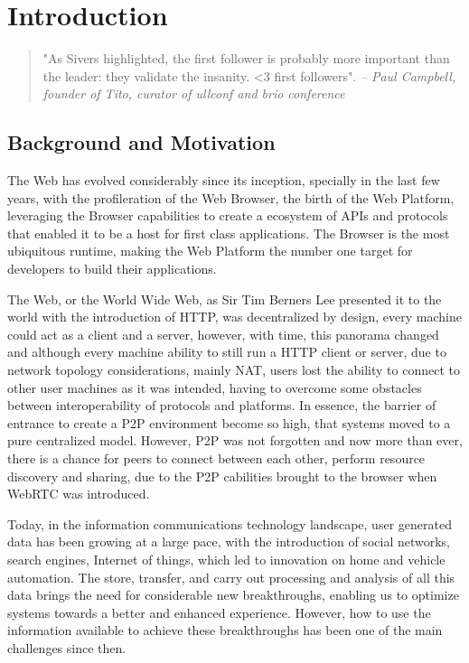 \chapter{Introduction}\label{ch:intro}

\begin{quotation}
    "As Sivers highlighted, the first follower is probably more important than the leader: they validate the insanity. <3 first followers".
    {\small\it -- Paul Campbell, founder of Tito, curator of ullconf and brio conference}
\end{quotation}

\section{Background and Motivation}

The Web has evolved considerably since its inception, specially in the last few years, with the profileration of the Web Browser, the birth of the Web Platform, leveraging the Browser capabilities to create a ecosystem of APIs and protocols that enabled it to be a host for first class applications. The Browser is the most ubiquitous runtime, making the Web Platform the number one target for developers to build their applications.

The Web, or the World Wide Web, as Sir Tim Berners Lee presented it to the world with the introduction of HTTP, was decentralized by design, every machine could act as a client and a server, however, with time, this panorama changed and although every machine ability to still run a HTTP client or server, due to network topology considerations, mainly NAT, users lost the ability to connect to other user machines as it was intended, having to overcome some obstacles between interoperability of protocols and platforms. In essence, the barrier of entrance to create a P2P environment become so high, that systems moved to a pure centralized model. However, P2P was not forgotten and now more than ever, there is a chance for peers to connect between each other, perform resource discovery and sharing, due to the P2P cabilities brought to the browser when WebRTC was introduced.

Today, in the information communications technology landscape, user generated data has been growing at a large pace, with the introduction of social networks, search engines, Internet of things, which led to innovation on home and vehicle automation. The store, transfer, and carry out processing and analysis of all this data brings the need for considerable new breakthroughs, enabling us to optimize systems towards a better and enhanced experience. However, how to use the information available to achieve these breakthroughs has been one of the main challenges since then.


